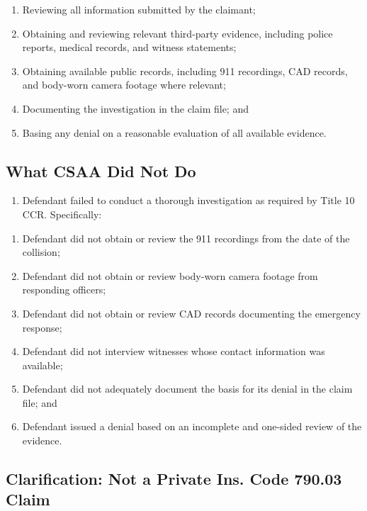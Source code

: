 \begin{enumerate}
\def\labelenumi{(\alph{enumi})}
\tightlist
\item
  Reviewing all information submitted by the claimant;
\item
  Obtaining and reviewing relevant third-party evidence, including police reports, medical records, and witness statements;
\item
  Obtaining available public records, including 911 recordings, CAD records, and body-worn camera footage where relevant;
\item
  Documenting the investigation in the claim file; and
\item
  Basing any denial on a reasonable evaluation of all available evidence.
\end{enumerate}

\subsection{What CSAA Did Not Do}\label{what-csaa-did-not-do}

\begin{enumerate}
\def\labelenumi{\arabic{enumi}.}
\setcounter{enumi}{45}
\tightlist
\item
  Defendant failed to conduct a thorough investigation as required by Title 10 CCR. Specifically:
\end{enumerate}

\begin{enumerate}
\def\labelenumi{(\alph{enumi})}
\tightlist
\item
  Defendant did not obtain or review the 911 recordings from the date of the collision;
\item
  Defendant did not obtain or review body-worn camera footage from responding officers;
\item
  Defendant did not obtain or review CAD records documenting the emergency response;
\item
  Defendant did not interview witnesses whose contact information was available;
\item
  Defendant did not adequately document the basis for its denial in the claim file; and
\item
  Defendant issued a denial based on an incomplete and one-sided review of the evidence.
\end{enumerate}

\subsection{Clarification: Not a Private Ins. Code \textsection{} 790.03 Claim}\label{clarification-not-a-private-ins.-code-790.03-claim}

